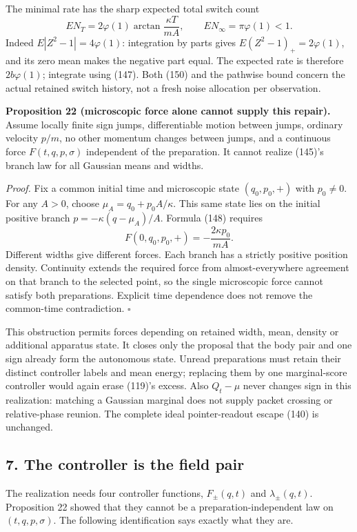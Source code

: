 \documentclass[11pt,a4paper]{article}
\begin{document}
The minimal rate has the sharp expected total switch count
\[E N_T=2\varphi(1)\arctan\frac{\kappa T}{mA},\qquad
E N_\infty=\pi\varphi(1)<1.\tag{150}\] Indeed \(E|Z^2-1|=4\varphi(1)\):
integration by parts gives \(E(Z^2-1)_+=2\varphi(1)\), and its zero mean
makes the negative part equal. The expected rate is therefore
\(2b\varphi(1)\); integrate using (147). Both (150) and the pathwise
bound concern the actual retained switch history, not a fresh noise
allocation per observation.

\textbf{Proposition 22 (microscopic force alone cannot supply this
repair).} Assume locally finite sign jumps, differentiable motion
between jumps, ordinary velocity \(p/m\), no other momentum changes
between jumps, and a continuous force \(F(t,q,p,\sigma)\) independent of
the preparation. It cannot realize (145)'s branch law for all Gaussian
means and widths.

\emph{Proof.} Fix a common initial time and microscopic state
\((q_0,p_0,+)\) with \(p_0\ne0\). For any \(A>0\), choose
\(\mu_A=q_0+p_0A/\kappa\). This same state lies on the initial positive
branch \(p=-\kappa(q-\mu_A)/A\). Formula (148) requires
\[F(0,q_0,p_0,+)=-\frac{2\kappa p_0}{mA}.\tag{151}\] Different widths
give different forces. Each branch has a strictly positive position
density. Continuity extends the required force from almost-everywhere
agreement on that branch to the selected point, so the single
microscopic force cannot satisfy both preparations. Explicit time
dependence does not remove the common-time contradiction. \(\square\)

This obstruction permits forces depending on retained width, mean,
density or additional apparatus state. It closes only the proposal that
the body pair and one sign already form the autonomous state. Unread
preparations must retain their distinct controller labels and mean
energy; replacing them by one marginal-score controller would again
erase (119)'s excess. Also \(Q_t-\mu\) never changes sign in this
realization: matching a Gaussian marginal does not supply packet
crossing or relative-phase reunion. The complete ideal pointer-readout
escape (140) is unchanged.

\hypertarget{the-controller-is-the-field-pair}{%
\subsection{7. The controller is the field
pair}\label{the-controller-is-the-field-pair}}

The realization needs four controller functions, \(F_\pm(q,t)\) and
\(\lambda_\pm(q,t)\). Proposition 22 showed that they cannot be a
preparation-independent law on \((t,q,p,\sigma)\). The following
identification says exactly what they are.
\end{document}
